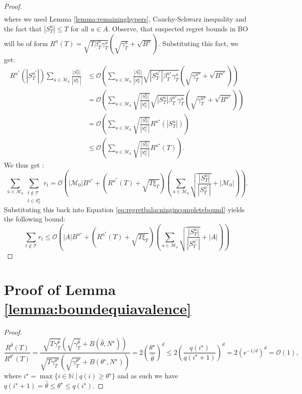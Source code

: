 \documentclass{article}
\theoremstyle{plain}
\theoremstyle{definition}
\theoremstyle{remark}
\theoremstyle{plain}
\begin{document}
\begin{proof}
\begin{align*}
\end{align*}
where we used Lemma \ref{lemma:remaininghypers}, Cauchy-Schwarz inequality and the fact that $|S_T^u| \le T$ for all $u \in A$. Observe, that suspected regret bounds in BO will be of form $R^u(T) = \sqrt{T \beta^u_T \gamma_T^u} (\sqrt{\gamma_T^u} + \sqrt{B^u})$. Substituting this fact, we get:
\begin{align*}
    R^{u^*}(|S_T^{u^*}|)\sum_{u \in \mathcal{M}_0} \frac{|S_T^{u}|}{|S_T^{u^*}|} &\le \mathcal{O}\left( \sum_{u \in \mathcal{M}_0} \frac{|S_T^{u}|}{|S_T^{u^*}|} \sqrt{|S_T^{u^*}| \beta^{u^\star}_T \gamma_T^u} \left(\sqrt{\gamma_T^{u^\star}} + \sqrt{B^{u^\star}} \right)\right) \\
    & =  \mathcal{O}\left( \sum_{u \in \mathcal{M}_0} \sqrt{\frac{|S_T^{u}|}{|S_T^{u^*}|}} \sqrt{ |S_T^{u}|\beta^{u^\star}_T \gamma_T^u} \left(\sqrt{\gamma_T^{u^\star}} + \sqrt{B^{u^\star}} \right)\right) \\
    & =  \mathcal{O}\left( \sum_{u \in \mathcal{M}_0} \sqrt{\frac{|S_T^{u}|}{|S_T^{u^*}|}} R^{u^\star}(|S_T^{u}|)\right) \\
    & \le  \mathcal{O}\left(  \sum_{u \in \mathcal{M}_0} \sqrt{\frac{|S_T^{u}|}{|S_T^{u^*}|}} R^{u^\star}(T)\right) .
\end{align*}
We thus get :
\begin{equation*}
\sum_{u \in\mathcal{M}_0} \sum_{\substack{t \notin \mathcal{T} \\ t \in S_T^u }} r_t = \mathcal{O} \left(|\mathcal{M}_0|B^{u^\star} + \left(R^{u^*}(T) + \sqrt{T\xi_T}  \right) \left(\sum_{u \in \mathcal{M}_0}\sqrt{\frac{|S_T^{u}|}{|S_T^{u^*}|}} + |\mathcal{M}_0| \right) \right) .
\end{equation*}
Substituting this back into Equation \ref{eq:regretbalacningincompletebound} yields the following bound:
\begin{equation*}
    \sum_{t \notin \mathcal{T}} r_t \le \mathcal{O} \left(|A|B^{u^\star} + \left(R^{u^*}(T) + \sqrt{T\xi_T}  \right) \left(\sum_{u \in \mathcal{M}_0}\sqrt{\frac{|S_T^{u}|}{|S_T^{u^*}|}} + |A| \right) \right) 
\end{equation*}
\end{proof}
\section{Proof of Lemma \ref{lemma:boundequiavalence}} \label{app:boundeqbound}
\boundequiavalence*
\begin{proof}
    \begin{equation*}
        \frac{R^{\hat{\theta}}(T)}{R^{\theta^\star}(T)} = \frac{ \sqrt{T\gamma_T^{\hat{\theta}}} \left( \sqrt{\gamma_T^{\hat{\theta}}} + B(\hat{\theta}, N^\star) \right)}{ \sqrt{T\gamma_T^{\theta^\star}} \left( \sqrt{\gamma_T^{\theta^\star}} + B(\theta^\star, N^\star) \right)} = 2\left(\frac{\theta^\star}{\hat{\theta}}\right)^{d} \le  2\left(\frac{q(i^\star)}{q(i^\star + 1)}\right)^{d} = 2\left(e^{-1/d}\right)^{d} = \mathcal{O}(1),
    \end{equation*}
    where $i^\star = \max \{ i \in \mathbb{N} \mid q(i) \ge \theta^\star \}$ and as such we have $q(i^\star + 1) = \hat{\theta} \le \theta^\star \le  q(i^\star) $.
\end{proof}
\end{document}
